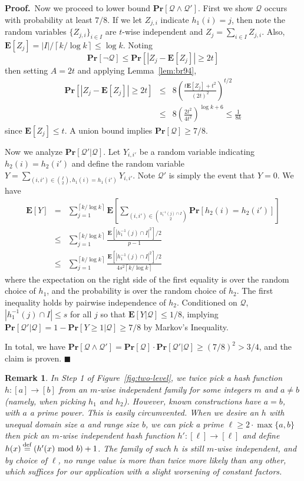 \documentclass[letterpaper,11pt]{article}
\newcommand{\ceil}[1]{\left\lceil #1 \right\rceil}
\newcommand{\E}{\mathbf{E}}
\renewcommand{\Pr}{\mathbf{Pr}}
\renewcommand{\mod}{\hbox{ mod }}
\newcommand{\RemarkName}[1]{\label{rem:#1}}
\newcommand{\Lemma}[1]{Lemma~\ref{lem:#1}}
\newcommand{\Figure}[1]{Figure~\ref{fig:#1}}
\newtheorem{remark}[theorem]{Remark}
\newcommand{\proofbelow}{3pt}
\newcommand{\afterproof}{\hfill $\blacksquare$ \par \vspace{\proofbelow}}
\renewenvironment{proof}{\noindent\textbf{Proof.}\,}{\afterproof}
\newcommand{\eqdef}{\mathbin{\stackrel{\rm def}{=}}}
\begin{document}
\begin{proof}
Now we proceed to lower bound $\Pr[\mathcal{Q}\wedge
\mathcal{Q}']$. First
we show $\mathcal{Q}$ occurs with probability at least $7/8$.
If we let $Z_{j,i}$ indicate $h_1(i) = j$, then note the random
variables $\{Z_{j,i}\}_{i\in I}$ are $t$-wise independent and $Z_j =
\sum_{i\in I} Z_{j,i}$. Also, $\E[Z_j] = |I|/\ceil{k/\log k} \le \log k$.  
Noting 
$$\Pr[\neg\mathcal{Q}] \le \Pr[|Z_j - \E[Z_j]| \ge 2t]$$
then setting $A = 2t$ and applying \Lemma{br94},
\begin{eqnarray*}
\Pr[|Z_j - \E[Z_j]| \ge 2t] &\le&
8\left(\frac{t\E[Z_j] + t^2}{(2t)^2}\right)^{t/2}\\
&\le& 8\left(\frac{2t^2}{4t^2}\right)^{\log k + 6} \le \frac{1}{8k}
\end{eqnarray*}
since $\E[Z_j] \le t$.  A union bound implies $\Pr[\mathcal{Q}] \ge
7/8$.

Now we analyze $\Pr[\mathcal{Q}'|\mathcal{Q}]$.  Let $Y_{i,i'}$ be a
random variable indicating $h_2(i) = h_2(i')$ and define the random
variable $Y =
\sum_{(i,i')\in\binom{I}{2},h_1(i)=h_1(i')} Y_{i,i'}$. Note
$\mathcal{Q'}$ is simply the event that $Y = 0$.  We have
\begin{eqnarray*}
\E[Y] &=& \sum_{j=1}^{\ceil{k/\log k}}\E\left[
  \sum_{(i,i')\in\binom{h_1^{-1}(j)\cap I}{2}}
  \Pr[h_2(i)=h_2(i')]\right]\\
&\le& \sum_{j=1}^{\ceil{k/\log k}} \frac{\E[|h_1^{-1}(j)\cap
  I|^2]/2}{p-1}\\
&\le&
\sum_{j=1}^{\ceil{k/\log k}} \frac{\E[|h_1^{-1}(j)\cap I|^2]/2}{4s^2\ceil{k/\log
      k}}
\end{eqnarray*}
where the expectation on the right side of the first equality is
over the random choice of
$h_1$, and the probability is over the random choice of $h_2$.  The
first inequality holds by pairwise independence of $h_2$.
Conditioned on $\mathcal{Q}$, $|h_1^{-1}(j)\cap I| \le s$ for all
$j$ so that $\E[Y|\mathcal{Q}] \le 1/8$, implying
$\Pr[\mathcal{Q'}|\mathcal{Q}] = 1 - \Pr[Y
\ge 1|\mathcal{Q}] \ge 7/8$ by Markov's Inequality.

In total, we have $\Pr[\mathcal{Q}\wedge\mathcal{Q}'] =
\Pr[\mathcal{Q}]\cdot \Pr[\mathcal{Q}'|\mathcal{Q}] \ge (7/8)^2 >
3/4$, and the claim is proven.
\end{proof}

\begin{remark}\RemarkName{hash-stuff}
In Step 1 of \Figure{two-level}, we twice pick a hash function
$h:[a]\rightarrow [b]$ from an $m$-wise independent family for
some integers $m$ and $a\neq b$ (namely, when picking $h_1$ and
$h_2$). However, known
constructions \cite{CW79} have $a=b$, with $a$ a prime power.  This is
easily circumvented.
When we desire an $h$ with unequal domain size $a$ and range size $b$,
we can pick a prime $\ell\ge2\cdot
\max\{a,b\}$ then pick an $m$-wise independent hash function
$h':[\ell]\rightarrow [\ell]$ and define $h(x) \eqdef (h'(x)\mod b) +
1$. The family of such $h$ is still $m$-wise independent, and by
choice of $\ell$, no range value is more than twice more likely than any
other, which suffices for our application with a slight worsening of
constant factors.
\end{remark}
\end{document}
